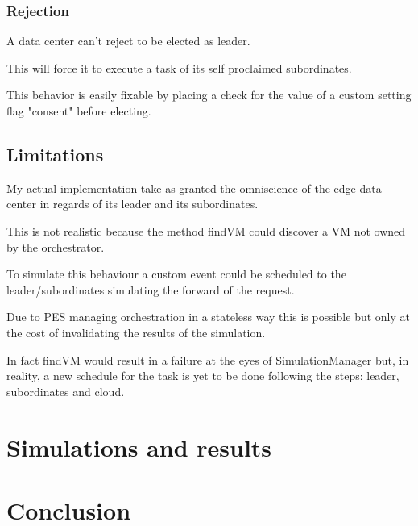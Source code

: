 \documentclass[12pt]{report}
\begin{document}
\subsection*{Rejection}
A data center can't reject to be elected as leader. 

This will force it to execute a task of its self proclaimed subordinates.

This behavior is easily fixable by placing a check for the value of a custom setting flag "consent" before electing.

\section*{Limitations}
My actual implementation take as granted the omniscience of the edge data center in regards of its leader and its subordinates.

This is not realistic because the method findVM could discover a VM not owned by the orchestrator.

To simulate this behaviour a custom event could be scheduled to the leader/subordinates simulating the forward of the request.

Due to PES managing orchestration in a stateless way this is possible but only at the cost of invalidating the results of the simulation.

In fact findVM would result in a failure at the eyes of SimulationManager but, in reality, a new schedule for the task is yet to be done following the steps: leader, subordinates and cloud.

\chapter{Simulations and results}

\chapter{Conclusion}
\end{document}

